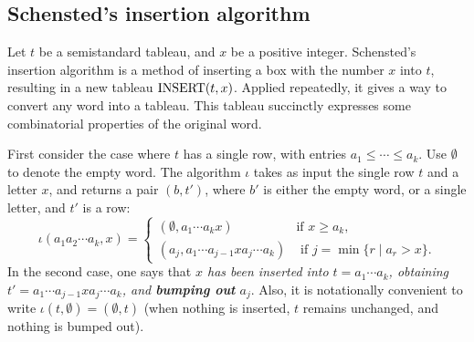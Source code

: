 \documentclass[11pt]{amsart}
\theoremstyle{definition}
\theoremstyle{example}
\newcommand{\rins}{\iota}
\newcommand{\ins}{\textup{INSERT}}
\begin{document}
\subsection{Schensted's insertion algorithm}
\label{sec:schenst-insert-algor}
Let $t$ be a semistandard tableau, and $x$ be a positive integer.
Schensted's insertion algorithm is a method of inserting a box with the number $x$ into $t$, resulting in a new tableau $\ins(t, x)$.
Applied repeatedly, it gives a way to convert any word into a tableau.
This tableau succinctly expresses some combinatorial properties of the original word.

First consider the case where $t$ has a single row, with entries $a_1\leq \dotsb \leq a_k$.
Use $\emptyset$ to denote the empty word.
The algorithm $\rins$ takes as input the single row $t$ and a letter $x$, and returns a pair $(b, t')$, where $b'$ is either the empty word, or a single letter, and $t'$ is a row:
\begin{displaymath}
  \rins(a_1a_2\dotsb a_k, x) =
  \begin{cases}
    (\emptyset, a_1\dotsb a_k x) & \text{if $x\geq a_k$},\\
    (a_j, a_1\dotsb a_{j-1} x a_j \dotsb a_k) & \text{ if } j = \min\{r \mid a_r > x\}.
  \end{cases}
\end{displaymath}
In the second case, one says that \emph{$x$ has been inserted into $t=a_1\dotsb a_k$, obtaining $t'=a_1\dotsb a_{j-1} x a_j \dotsb a_k$, and \textbf{bumping out} $a_j$}.
Also, it is notationally convenient to write $\rins(t, \emptyset) = (\emptyset, t)$ (when nothing is inserted, $t$ remains unchanged, and nothing is bumped out).
\end{document}
